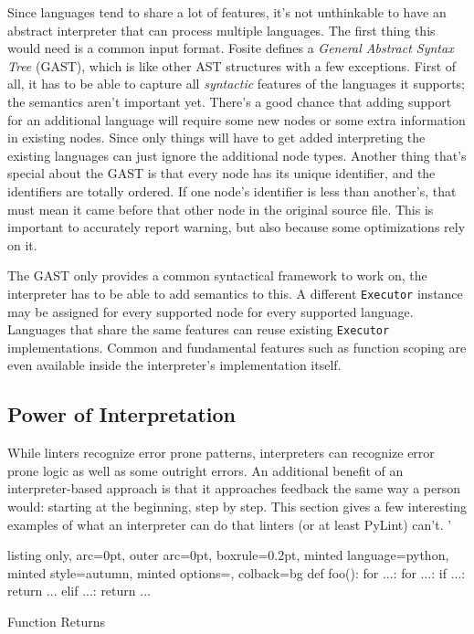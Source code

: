 \documentclass[]{article}
\begin{document}
Since languages tend to share a lot of features, it's not unthinkable to
have an abstract interpreter that can process multiple languages. The
first thing this would need is a common input format. Fosite defines a
\emph{General Abstract Syntax Tree} (GAST), which is like other AST
structures with a few exceptions. First of all, it has to be able to
capture all \emph{syntactic} features of the languages it supports; the
semantics aren't important yet. There's a good chance that adding
support for an additional language will require some new nodes or some
extra information in existing nodes. Since only things will have to get
added interpreting the existing languages can just ignore the additional
node types. Another thing that's special about the GAST is that every
node has its unique identifier, and the identifiers are totally ordered.
If one node's identifier is less than another's, that must mean it came
before that other node in the original source file. This is important to
accurately report warning, but also because some optimizations rely on
it.

The GAST only provides a common syntactical framework to work on, the
interpreter has to be able to add semantics to this. A different
\texttt{Executor} instance may be assigned for every supported node for
every supported language. Languages that share the same features can
reuse existing \texttt{Executor} implementations. Common and fundamental
features such as function scoping are even available inside the
interpreter's implementation itself.

\subsection{Power of Interpretation}\label{power-of-interpretation}

While linters recognize error prone patterns, interpreters can recognize
error prone logic as well as some outright errors. An additional benefit
of an interpreter-based approach is that it approaches feedback the same
way a person would: starting at the beginning, step by step. This
section gives a few interesting examples of what an interpreter can do
that linters (or at least PyLint) can't. '

\begin{code}
  \begin{tcblisting}{listing only, 
  arc=0pt,
  outer arc=0pt, 
  boxrule=0.2pt,
  minted language=python,
  minted style=autumn,
  minted options={},
  colback=bg }
def foo():
    for ...:
        for ...:
            if ...:
                return ...
            elif ...:
                return ...
\end{tcblisting}
\caption{Function Returns} \label{smp:return}
\end{code}
\end{document}
